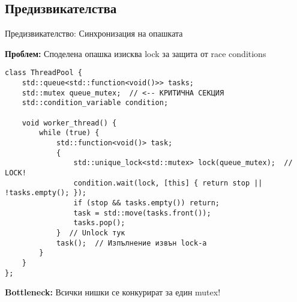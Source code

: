 \documentclass[aspectratio=169]{beamer}
\begin{document}
\subsection{Предизвикателства}

\begin{frame}[fragile]{Предизвикателство: Синхронизация на опашката}

\textbf{Проблем:} Споделена опашка изисква lock за защита от race conditions

\begin{lstlisting}[basicstyle=\ttfamily\tiny]
class ThreadPool {
    std::queue<std::function<void()>> tasks;
    std::mutex queue_mutex;  // <-- КРИТИЧНА СЕКЦИЯ
    std::condition_variable condition;
    
    void worker_thread() {
        while (true) {
            std::function<void()> task;
            {
                std::unique_lock<std::mutex> lock(queue_mutex);  // LOCK!
                condition.wait(lock, [this] { return stop || !tasks.empty(); });
                if (stop && tasks.empty()) return;
                task = std::move(tasks.front());
                tasks.pop();
            }  // Unlock тук
            task();  // Изпълнение извън lock-а
        }
    }
};
\end{lstlisting}

\textbf{Bottleneck:} Всички нишки се конкурират за един mutex!
\end{frame}
\end{document}
